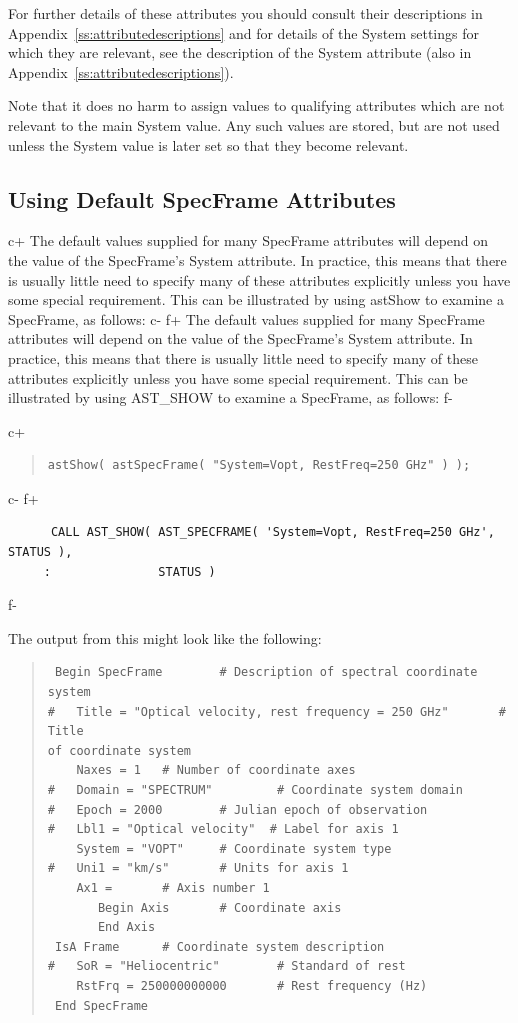 \documentclass[twoside,11pt]{article}
\newcommand{\appref}[1]{Appendix~\ref{#1}}
\newcommand{\appref}[1]{\ref{#1}}
\begin{document}
For further details of these attributes you should consult their
descriptions in \appref{ss:attributedescriptions} and for details of
the System settings for which they are relevant, see the description
of the System attribute (also in \appref{ss:attributedescriptions}).

Note that it does no harm to assign values to qualifying attributes
which are not relevant to the main System value. Any such values are
stored, but are not used unless the System value is later set so that
they become relevant.

\subsection{Using Default SpecFrame Attributes}

c+
The default values supplied for many SpecFrame attributes will depend
on the value of the SpecFrame's System attribute. In practice, this
means that there is usually little need to specify many of these
attributes explicitly unless you have some special requirement. This
can be illustrated by using astShow to examine a SpecFrame, as follows:
c-
f+
The default values supplied for many SpecFrame attributes will depend
on the value of the SpecFrame's System attribute. In practice, this
means that there is usually little need to specify many of these
attributes explicitly unless you have some special requirement. This
can be illustrated by using AST\_SHOW to examine a SpecFrame, as
follows:
f-

c+
\begin{quote}
\small
\begin{verbatim}
astShow( astSpecFrame( "System=Vopt, RestFreq=250 GHz" ) );
\end{verbatim}
\normalsize
\end{quote}
c-
f+
\small
\begin{verbatim}
      CALL AST_SHOW( AST_SPECFRAME( 'System=Vopt, RestFreq=250 GHz', STATUS ), 
     :               STATUS )
\end{verbatim}
\normalsize
f-

The output from this might look like the following:

\begin{quote}
\begin{verbatim}
 Begin SpecFrame        # Description of spectral coordinate system
#   Title = "Optical velocity, rest frequency = 250 GHz"       # Title
of coordinate system
    Naxes = 1   # Number of coordinate axes
#   Domain = "SPECTRUM"         # Coordinate system domain
#   Epoch = 2000        # Julian epoch of observation
#   Lbl1 = "Optical velocity"  # Label for axis 1
    System = "VOPT"     # Coordinate system type
#   Uni1 = "km/s"       # Units for axis 1
    Ax1 =       # Axis number 1
       Begin Axis       # Coordinate axis
       End Axis
 IsA Frame      # Coordinate system description
#   SoR = "Heliocentric"        # Standard of rest
    RstFrq = 250000000000       # Rest frequency (Hz)
 End SpecFrame
\end{verbatim}
\end{quote}
\end{document}
